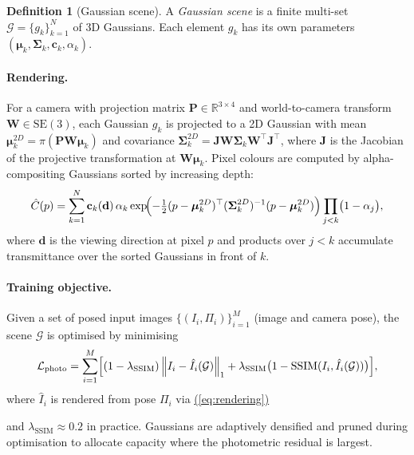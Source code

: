 \documentclass[11pt,a4paper]{article}
\renewcommand{\eqref}[1]{%
    \hyperref[#1]{\textcolor{eqred}{(\ref*{#1})}}%
}
\theoremstyle{plain}
\theoremstyle{definition}
\newtheorem{definition}[theorem]{Definition}
\theoremstyle{remark}
\newcommand{\norm}[1]{\left\lVert #1 \right\rVert}
\newcommand{\SE}{\mathrm{SE}}
\newcommand{\GS}{\mathcal{G}}
\begin{document}
\begin{definition}[Gaussian scene]
\label{def:scene}
A \emph{Gaussian scene} is a finite multi-set
$\GS = \{g_k\}_{k=1}^N$ of 3D Gaussians. Each element $g_k$ has
its own parameters $({\boldsymbol\mu}_k, {\boldsymbol\Sigma}_k,
\mathbf{c}_k, \alpha_k)$.
\end{definition}

\paragraph{Rendering.}
For a camera with projection matrix $\mathbf{P} \in \mathbb{R}^{3\times4}$
and world-to-camera transform $\mathbf{W} \in \SE(3)$, each Gaussian
$g_k$ is projected to a 2D Gaussian with mean
${\boldsymbol\mu}_k^{2D} = \pi(\mathbf{P}\mathbf{W}{\boldsymbol\mu}_k)$
and covariance
${\boldsymbol\Sigma}_k^{2D} = \mathbf{J}\mathbf{W}{\boldsymbol\Sigma}_k
\mathbf{W}^\top\mathbf{J}^\top$,
where $\mathbf{J}$ is the Jacobian of the projective transformation
at $\mathbf{W}{\boldsymbol\mu}_k$. Pixel colours are computed by
alpha-compositing Gaussians sorted by increasing depth:
\begin{equation}
  \hat{C}(p) = \sum_{k=1}^{N} \mathbf{c}_k(\mathbf{d})
  \,\alpha_k
  \exp\!\Bigl(-\tfrac{1}{2}
    (p - {\boldsymbol\mu}_k^{2D})^\top
    ({\boldsymbol\Sigma}_k^{2D})^{-1}
    (p - {\boldsymbol\mu}_k^{2D})\Bigr)
  \prod_{j < k}\bigl(1 - \alpha_j\bigr),
  \label{eq:rendering}
\end{equation}
where $\mathbf{d}$ is the viewing direction at pixel $p$ and products
over $j < k$ accumulate transmittance over the sorted Gaussians in
front of $k$.

\paragraph{Training objective.}
Given a set of posed input images $\{(I_i, \Pi_i)\}_{i=1}^M$ (image and
camera pose), the scene $\GS$ is optimised by minimising
\begin{equation}
  \mathcal{L}_{\text{photo}} = \sum_{i=1}^{M}
  \Bigl[
    (1 - \lambda_{\mathrm{SSIM}})
    \norm{I_i - \hat{I}_i(\GS)}_1
    + \lambda_{\mathrm{SSIM}}
    \bigl(1 - \mathrm{SSIM}(I_i, \hat{I}_i(\GS))\bigr)
  \Bigr],
  \label{eq:photo_loss}
\end{equation}
where $\hat{I}_i$ is rendered from pose $\Pi_i$ via \eqref{eq:rendering}
and $\lambda_{\mathrm{SSIM}} \approx 0.2$ in practice. Gaussians are
adaptively densified and pruned during optimisation to allocate capacity
where the photometric residual is largest.
\end{document}
